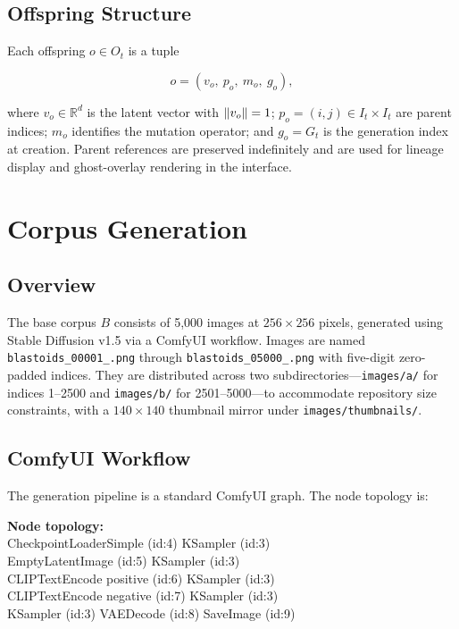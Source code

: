 \documentclass[12pt, a4paper]{article}
\DeclarePairedDelimiter{\norm}{\lVert}{\rVert}
\theoremstyle{definition}
\begin{document}
\subsection{Offspring Structure}

Each offspring $o \in O_t$ is a tuple

\begin{equation}
o = (v_o,\ p_o,\ m_o,\ g_o),
\end{equation}

where $v_o \in \mathbb{R}^d$ is the latent vector with $\norm{v_o} = 1$; $p_o = (i, j) \in I_t \times I_t$ are parent indices; $m_o$ identifies the mutation operator; and $g_o = G_t$ is the generation index at creation. Parent references are preserved indefinitely and are used for lineage display and ghost-overlay rendering in the interface.

\section{Corpus Generation}

\subsection{Overview}

The base corpus $B$ consists of 5,000 images at $256 \times 256$ pixels, generated using Stable Diffusion v1.5 via a ComfyUI workflow. Images are named \texttt{blastoids\_00001\_.png} through \texttt{blastoids\_05000\_.png} with five-digit zero-padded indices. They are distributed across two subdirectories---\texttt{images/a/} for indices 1--2500 and \texttt{images/b/} for 2501--5000---to accommodate repository size constraints, with a $140 \times 140$ thumbnail mirror under \texttt{images/thumbnails/}.

\subsection{ComfyUI Workflow}

The generation pipeline is a standard ComfyUI graph. The node topology is:

\begin{infobox}
\small\ttfamily\color{termgreen}
\textbf{Node topology:}\\
CheckpointLoaderSimple (id:4) \textrightarrow{} KSampler (id:3)\\
EmptyLatentImage (id:5) \textrightarrow{} KSampler (id:3)\\
CLIPTextEncode positive (id:6) \textrightarrow{} KSampler (id:3)\\
CLIPTextEncode negative (id:7) \textrightarrow{} KSampler (id:3)\\
KSampler (id:3) \textrightarrow{} VAEDecode (id:8) \textrightarrow{} SaveImage (id:9)
\end{infobox}
\end{document}
